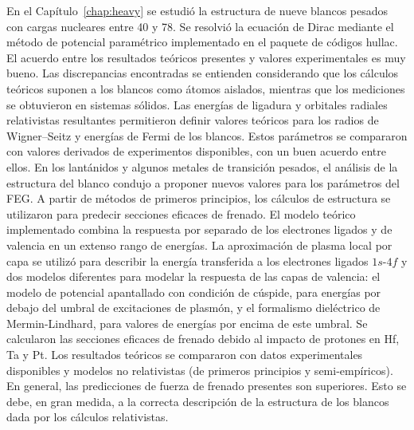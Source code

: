 En el Capítulo~\ref{chap:heavy} se estudió la estructura de nueve 
blancos pesados con cargas nucleares entre 40 y 78. Se resolvió la 
ecuación de Dirac mediante el método de potencial paramétrico 
implementado en el paquete de códigos {\sc hullac}. El acuerdo entre los 
resultados teóricos presentes y valores experimentales es muy bueno. Las 
discrepancias encontradas se entienden considerando que los cálculos 
teóricos suponen a los blancos como átomos aislados, mientras que los 
mediciones se obtuvieron en sistemas sólidos. Las energías de ligadura y 
orbitales radiales relativistas resultantes permitieron definir valores 
teóricos para los radios de Wigner--Seitz y energías de Fermi de los 
blancos. Estos parámetros se compararon con valores derivados de 
experimentos disponibles, con un buen acuerdo entre ellos. En los 
lantánidos y algunos metales de transición pesados, el análisis de la 
estructura del blanco condujo a proponer nuevos valores para los 
parámetros del FEG. A partir de métodos de primeros principios, los 
cálculos de estructura se utilizaron para predecir secciones eficaces de 
frenado. El modelo teórico implementado combina la respuesta por 
separado de los electrones ligados y de valencia en un extenso rango de 
energías. La aproximación de plasma local por capa se utilizó 
para describir la energía transferida a los electrones ligados $1s$-$4f$ 
y dos modelos diferentes para modelar la respuesta de las capas de 
valencia: el modelo de potencial apantallado con condición de cúspide, 
para energías por debajo del umbral de excitaciones de plasmón, y el 
formalismo dieléctrico de Mermin-Lindhard, para valores de energías por 
encima de este umbral. Se calcularon las secciones eficaces de frenado 
debido al impacto de protones en Hf, Ta y Pt. Los resultados teóricos se 
compararon con datos experimentales disponibles y modelos no 
relativistas (de primeros principios y semi-empíricos). En general, las 
predicciones de fuerza de frenado presentes son superiores. Esto se 
debe, en gran medida, a la correcta descripción de la estructura de los 
blancos dada por los cálculos relativistas.



